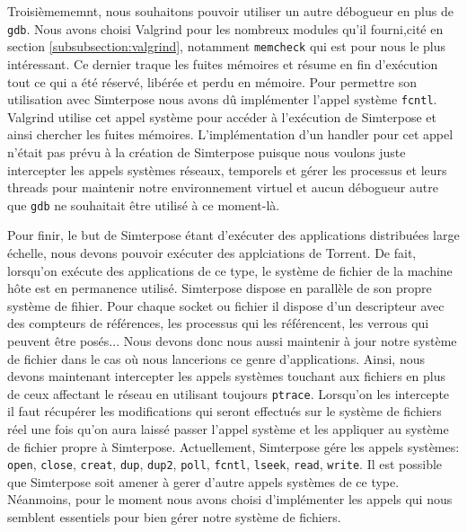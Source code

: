 \vspace{0.5cm}
Troisièmememnt, nous souhaitons pouvoir utiliser un autre débogueur en plus de \texttt{gdb}. Nous avons choisi Valgrind pour les nombreux modules qu'il fourni,cité en section \ref{subsubsection:valgrind}, notamment \texttt{memcheck} qui est pour nous le plus intéressant. Ce dernier traque les fuites mémoires et résume en fin d'exécution tout ce qui a été réservé, libérée et perdu en mémoire. Pour permettre son utilisation avec Simterpose nous avons dû implémenter l'appel système \texttt{fcntl}. Valgrind utilise cet appel système pour accéder à l'exécution de Simterpose et ainsi chercher les fuites mémoires. L'implémentation d'un handler pour cet appel n'était pas prévu à la création de Simterpose puisque nous voulons juste intercepter les appels systèmes réseaux, temporels et gérer les processus et leurs threads pour maintenir notre environnement virtuel et aucun débogueur autre que \texttt{gdb} ne souhaitait être utilisé à ce moment-là.

 \vspace{0.5cm}
Pour finir, le but de Simterpose étant d'exécuter des applications distribuées large échelle, nous devons pouvoir exécuter des applciations de Torrent. De fait, lorsqu'on exécute des applications de ce type, le système de fichier de la machine hôte est en permanence utilisé. Simterpose dispose en parallèle de son propre système de fihier. Pour chaque socket ou fichier il dispose d'un descripteur avec des compteurs de références, les processus qui les référencent, les verrous qui peuvent être posés... Nous devons donc nous aussi maintenir à jour notre système de fichier dans le cas où nous lancerions ce genre d'applications. Ainsi, nous devons maintenant intercepter les appels systèmes touchant aux fichiers en plus de ceux affectant le réseau en utilisant toujours \texttt{ptrace}. Lorsqu'on les intercepte il faut récupérer les modifications qui seront effectués sur le système de fichiers réel une fois qu'on aura laissé passer l'appel système et les appliquer au système de fichier propre à Simterpose. Actuellement, Simterpose gére les appels systèmes: \texttt{open},  \texttt{close}, \texttt{creat}, \texttt{dup}, \texttt{dup2}, \texttt{poll}, \texttt{fcntl}, \texttt{lseek}, \texttt{read}, \texttt{write}. Il est possible que Simterpose soit amener à gerer d'autre appels systèmes de ce type. Néanmoins, pour le moment nous avons choisi d'implémenter les appels qui nous semblent essentiels pour bien gérer notre système de fichiers.
